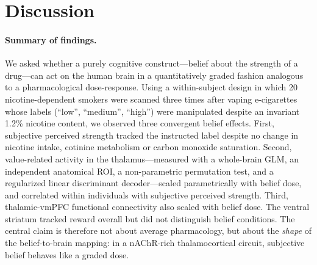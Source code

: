 \documentclass[11pt]{article}
\begin{document}
\section{Discussion}

\paragraph{Summary of findings.} We asked whether a purely cognitive construct---belief about the strength of a drug---can act on the human brain in a quantitatively graded fashion analogous to a pharmacological dose-response. Using a within-subject design in which 20 nicotine-dependent smokers were scanned three times after vaping e-cigarettes whose labels (``low'', ``medium'', ``high'') were manipulated despite an invariant 1.2\% nicotine content, we observed three convergent belief effects. First, subjective perceived strength tracked the instructed label despite no change in nicotine intake, cotinine metabolism or carbon monoxide saturation. Second, value-related activity in the thalamus---measured with a whole-brain GLM, an independent anatomical ROI, a non-parametric permutation test, and a regularized linear discriminant decoder---scaled parametrically with belief dose, and correlated within individuals with subjective perceived strength. Third, thalamic-vmPFC functional connectivity also scaled with belief dose. The ventral striatum tracked reward overall but did not distinguish belief conditions. The central claim is therefore not about average pharmacology, but about the \textit{shape} of the belief-to-brain mapping: in a nAChR-rich thalamocortical circuit, subjective belief behaves like a graded dose.
\end{document}
